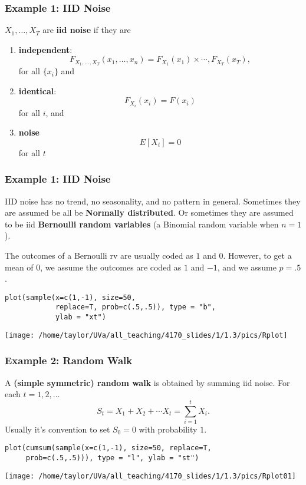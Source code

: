 \documentclass{beamer}
\begin{document}
\begin{frame}
\frametitle{Example 1: IID Noise}

$X_1, \ldots, X_T$ are {\bf iid  noise} if they are 

\begin{enumerate}
\item {\bf independent}:
  \[
    F_{X_{1}, \ldots, X_{T}}(x_{1}, \ldots, x_{n}) = F_{X_{1}}(x_1) \times  \cdots, F_{X_{T}}(x_{T}),
  \] for all $\{x_i\}$ and
\item {\bf identical}: 
  \[
    F_{X_i}(x_i) = F(x_i)
  \]for all $i$, and
\item {\bf noise} 
  \[
  E[X_t] = 0
  \]
  for all $t$
\end{enumerate}


\end{frame}


\begin{frame}[fragile]
\frametitle{Example 1: IID Noise}

IID noise has no trend, no seasonality, and no pattern in general. Sometimes they are assumed be all be {\bf Normally distributed}. Or sometimes they are assumed to be iid {\bf Bernoulli random variables} (a Binomial random variable when $n=1$).
\newline

The outcomes of a Bernoulli rv are usually coded as $1$ and $0$. However, to get a mean of $0$, we assume the outcomes are coded as $1$ and $-1$, and we assume $p=.5$.
\newline

\begin{verbatim}
plot(sample(x=c(1,-1), size=50, 
            replace=T, prob=c(.5,.5)), type = "b", 
            ylab = "xt")
\end{verbatim}
\texttt{[image: /home/taylor/UVa/all\_teaching/4170\_slides/1/1.3/pics/Rplot]}
\end{frame}


\begin{frame}[fragile]
\frametitle{Example 2: Random Walk}

A {\bf (simple symmetric) random walk} is obtained by summing iid noise. For each $t = 1, 2, \ldots$
\[
S_t = X_1 + X_2 + \cdots X_t = \sum_{i=1}^t X_i.
\]
Usually it's convention to set $S_0 = 0$ with probability $1$.

\begin{verbatim}
plot(cumsum(sample(x=c(1,-1), size=50, replace=T, 
     prob=c(.5,.5))), type = "l", ylab = "st")
\end{verbatim}
\texttt{[image: /home/taylor/UVa/all\_teaching/4170\_slides/1/1.3/pics/Rplot01]}
\end{frame}
\end{document}
